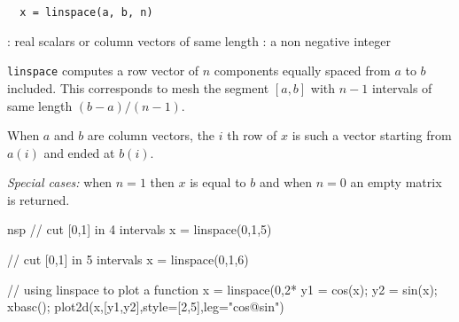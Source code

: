 \begin{mandesc}
\end{mandesc}
\begin{calling_sequence}
\begin{verbatim}
  x = linspace(a, b, n)
\end{verbatim}
\end{calling_sequence}

\begin{parameters}
  \begin{varlist}
    : real scalars or column vectors of same length
    : a non negative integer
  \end{varlist}
\end{parameters}
\begin{mandescription}
  \verb+linspace+ computes a row vector of $n$ components equally spaced from $a$ to $b$ included. This
  corresponds to mesh the segment $[a,b]$ with $n-1$ intervals of same length $(b-a)/(n-1)$.

   When $a$ and $b$ are column vectors, the $i$ th row of $x$ is such a vector starting from $a(i)$ and ended
  at $b(i)$.

  {\em Special cases: } when $n=1$ then $x$ is equal to $b$ and when $n=0$ an empty matrix is returned.
\end{mandescription}

\begin{examples}
\begin{mintednsp}{nsp}
// cut [0,1] in 4 intervals   
x = linspace(0,1,5)

// cut [0,1] in 5 intervals   
x = linspace(0,1,6)

// using linspace to plot a function   
x = linspace(0,2*%
y1 = cos(x); y2 = sin(x);
xbasc(); plot2d(x,[y1,y2],style=[2,5],leg="cos@sin")
\end{mintednsp}

\end{examples}

\begin{manseealso}
\end{manseealso}

